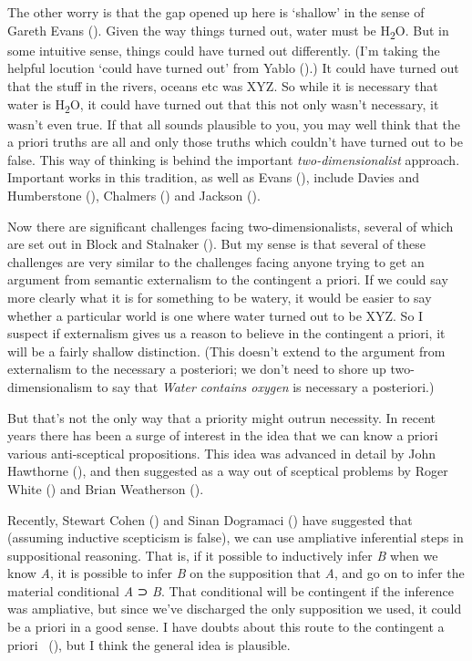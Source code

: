 \documentclass[
  11pt,
  letterpaper,
  DIV=11,
  numbers=noendperiod,
  twoside]{scrartcl}
\begin{document}
The other worry is that the gap opened up here is `shallow' in the sense
of Gareth Evans (). Given the way things
turned out, water must be H\textsubscript{2}O. But in some intuitive
sense, things could have turned out differently. (I'm taking the helpful
locution `could have turned out' from Yablo
().) It could have turned out that the
stuff in the rivers, oceans etc was XYZ. So while it is necessary that
water is H\textsubscript{2}O, it could have turned out that this not
only wasn't necessary, it wasn't even true. If that all sounds plausible
to you, you may well think that the a priori truths are all and only
those truths which couldn't have turned out to be false. This way of
thinking is behind the important \emph{two-dimensionalist} approach.
Important works in this tradition, as well as Evans
(), include Davies and Humberstone
(), Chalmers
() and Jackson
().

Now there are significant challenges facing two-dimensionalists, several
of which are set out in Block and Stalnaker
(). But my sense is that several of
these challenges are very similar to the challenges facing anyone trying
to get an argument from semantic externalism to the contingent a priori.
If we could say more clearly what it is for something to be watery, it
would be easier to say whether a particular world is one where water
turned out to be XYZ. So I suspect if externalism gives us a reason to
believe in the contingent a priori, it will be a fairly shallow
distinction. (This doesn't extend to the argument from externalism to
the necessary a posteriori; we don't need to shore up two-dimensionalism
to say that \emph{Water contains oxygen} is necessary a posteriori.)

But that's not the only way that a priority might outrun necessity. In
recent years there has been a surge of interest in the idea that we can
know a priori various anti-sceptical propositions. This idea was
advanced in detail by John Hawthorne
(), and then suggested as a way out of
sceptical problems by Roger White () and
Brian Weatherson ().

Recently, Stewart Cohen () and Sinan
Dogramaci () have suggested that
(assuming inductive scepticism is false), we can use ampliative
inferential steps in suppositional reasoning. That is, if it possible to
inductively infer \emph{B} when we know \emph{A}, it is possible to
infer \emph{B} on the supposition that \emph{A}, and go on to infer the
material conditional \emph{A} ⊃ \emph{B}. That conditional will be
contingent if the inference was ampliative, but since we've discharged
the only supposition we used, it could be a priori in a good sense. I
have doubts about this route to the contingent a priori
~(), but I think
the general idea is plausible.
\end{document}
